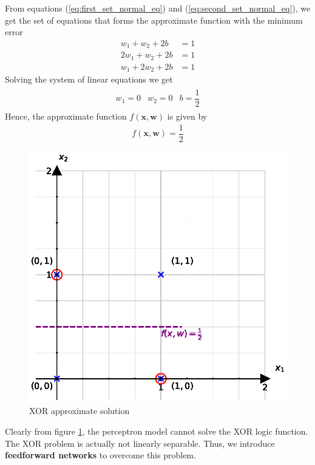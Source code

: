 From equations (\ref{eq:first_set_normal_eq}) and (\ref{eq:second_set_normal_eq}), we get the set of equations that forms the approximate function with the minimum error
\begin{align}
  w_1 + w_2 + 2b &= 1 \nonumber \\
  2w_1 + w_2 + 2b &= 1 \nonumber\\
  w_1 + 2w_2 + 2b &= 1 \nonumber
\end{align}
Solving the system of linear equations we get
\begin{align}
\begin{matrix}
  w_1 = 0 & w_2 = 0 & b = \dfrac{1}{2}
\end{matrix}  
\end{align}
Hence, the approximate function $f(\textbf{x},\textbf{w})$ is given by
\begin{align}
  f(\textbf{x},\textbf{w}) = \dfrac{1}{2}
\end{align}
\begin{figure}[H]
  \centering
  \includegraphics[scale=0.75]{CHAPTER_2/c2_fig_XOR_soln_python.eps}
  \caption{XOR approximate solution}
  \label{fig: approximate_XOR_solution}
\end{figure}
\noindent  Clearly from figure \ref{fig: approximate_XOR_solution}, the perceptron model cannot solve the XOR logic function. The XOR problem is actually not linearly separable. Thus, we introduce \textbf{feedforward networks} to overcome this problem.
